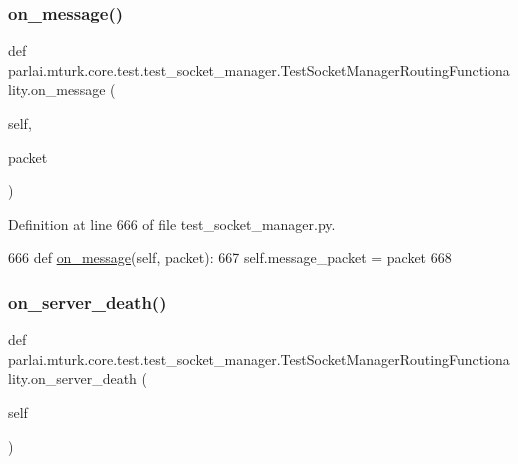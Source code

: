 \subsubsection{\texorpdfstring{on\+\_\+message()}{on\_message()}}
{\footnotesize\ttfamily def parlai.\+mturk.\+core.\+test.\+test\+\_\+socket\+\_\+manager.\+Test\+Socket\+Manager\+Routing\+Functionality.\+on\+\_\+message (\begin{DoxyParamCaption}\item[{}]{self,  }\item[{}]{packet }\end{DoxyParamCaption})}



Definition at line 666 of file test\+\_\+socket\+\_\+manager.\+py.


\begin{DoxyCode}
666     \textcolor{keyword}{def }\hyperlink{namespaceparlai_1_1chat__service_1_1services_1_1terminal__chat_1_1client_a0ef2bb2bd3b966dcdd8402a92b999708}{on\_message}(self, packet):
667         self.message\_packet = packet
668 
\end{DoxyCode}
\mbox{\label{classparlai_1_1mturk_1_1core_1_1test_1_1test__socket__manager_1_1TestSocketManagerRoutingFunctionality_a99bd283fec6b6422df3b0cd47ece433d}} 
\subsubsection{\texorpdfstring{on\+\_\+server\+\_\+death()}{on\_server\_death()}}
{\footnotesize\ttfamily def parlai.\+mturk.\+core.\+test.\+test\+\_\+socket\+\_\+manager.\+Test\+Socket\+Manager\+Routing\+Functionality.\+on\+\_\+server\+\_\+death (\begin{DoxyParamCaption}\item[{}]{self }\end{DoxyParamCaption})}



